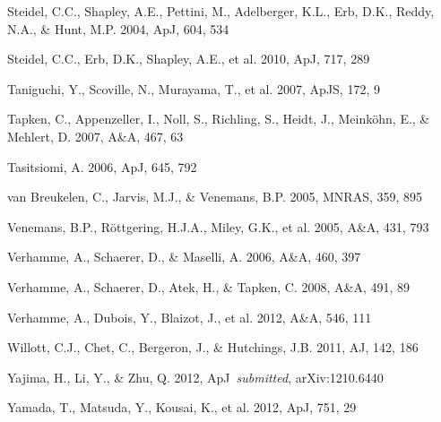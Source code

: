 \documentclass{emulateapj}
\def\apj{ApJ}
\def\apjs{ApJS}
\def\mnras{MNRAS}
\def\aj{AJ}
\def\aap{A\&A}
\begin{document}
\begin{thebibliography}{}
 Steidel, C.C., Shapley, A.E., Pettini, M., Adelberger, K.L., Erb, D.K., Reddy, N.A., \& Hunt, M.P. 2004, \apj, 604, 534

 Steidel, C.C., Erb, D.K., Shapley, A.E., et al. 2010, \apj, 717, 289

 Taniguchi, Y., Scoville, N., Murayama, T., et al. 2007, \apjs, 172, 9

 Tapken, C., Appenzeller, I., Noll, S., Richling, S., Heidt, J., Meink\"{o}hn, E., \& Mehlert, D. 2007, \aap, 467, 63

 Tasitsiomi, A. 2006, \apj, 645, 792

 van Breukelen, C., Jarvis, M.J., \& Venemans, B.P. 2005, \mnras, 359, 895

 Venemans, B.P., R\"{o}ttgering, H.J.A., Miley, G.K., et al. 2005, \aap, 431, 793

 Verhamme, A., Schaerer, D., \& Maselli, A. 2006, \aap, 460, 397

 Verhamme, A., Schaerer, D., Atek, H., \& Tapken, C. 2008, \aap, 491, 89

 Verhamme, A., Dubois, Y., Blaizot, J., et al. 2012, \aap, 546, 111

 Willott, C.J., Chet, C., Bergeron, J., \& Hutchings, J.B. 2011, \aj, 142, 186

 Yajima, H., Li, Y., \& Zhu, Q. 2012, \apj\ \textit{submitted}, arXiv:1210.6440 

 Yamada, T., Matsuda, Y., Kousai, K., et al. 2012, \apj, 751, 29 


\end{thebibliography}
\end{document}
